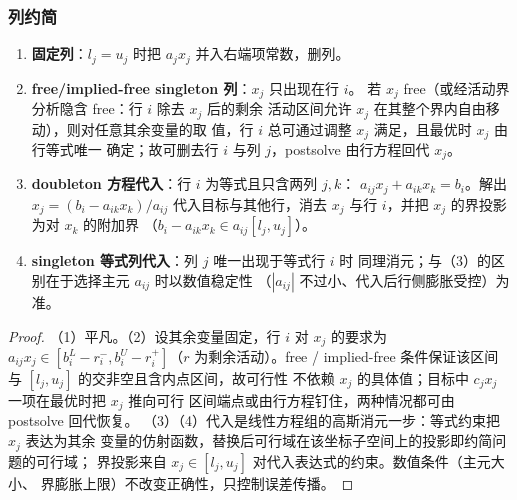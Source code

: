 \subsubsection{列约简}

\begin{proposition}[列约简规则的正确性]\label{prop:thlp-colrules}
\begin{enumerate}
  \item \textbf{固定列}：$l_j=u_j$ 时把 $a_j x_j$ 并入右端项常数，删列。
  \item \textbf{free/implied-free singleton 列}：$x_j$ 只出现在行 $i$。
        若 $x_j$ free（或经活动界分析隐含 free：行 $i$ 除去 $x_j$ 后的剩余
        活动区间允许 $x_j$ 在其整个界内自由移动），则对任意其余变量的取
        值，行 $i$ 总可通过调整 $x_j$ 满足，且最优时 $x_j$ 由行等式唯一
        确定；故可删去行 $i$ 与列 $j$，postsolve 由行方程回代 $x_j$。
  \item \textbf{doubleton 方程代入}：行 $i$ 为等式且只含两列 $j,k$：
        $a_{ij}x_j+a_{ik}x_k=b_i$。解出
        $x_j=(b_i-a_{ik}x_k)/a_{ij}$ 代入目标与其他行，消去 $x_j$ 与行
        $i$，并把 $x_j$ 的界投影为对 $x_k$ 的附加界
        （$b_i-a_{ik}x_k\in a_{ij}[l_j,u_j]$）。
  \item \textbf{singleton 等式列代入}：列 $j$ 唯一出现于等式行 $i$ 时
        同理消元；与（3）的区别在于选择主元 $a_{ij}$ 时以数值稳定性
        （$|a_{ij}|$ 不过小、代入后行侧膨胀受控）为准。
\end{enumerate}
\end{proposition}

\begin{proof}
（1）平凡。（2）设其余变量固定，行 $i$ 对 $x_j$ 的要求为
$a_{ij}x_j\in[b_i^{L}-r_i^{-},b_i^{U}-r_i^{+}]$（$r$ 为剩余活动）。free /
implied-free 条件保证该区间与 $[l_j,u_j]$ 的交非空且含内点区间，故可行性
不依赖 $x_j$ 的具体值；目标中 $c_jx_j$ 一项在最优时把 $x_j$ 推向可行
区间端点或由行方程钉住，两种情况都可由 postsolve 回代恢复。
（3）（4）代入是线性方程组的高斯消元一步：等式约束把 $x_j$ 表达为其余
变量的仿射函数，替换后可行域在该坐标子空间上的投影即约简问题的可行域；
界投影来自 $x_j\in[l_j,u_j]$ 对代入表达式的约束。数值条件（主元大小、
界膨胀上限）不改变正确性，只控制误差传播。
\end{proof}

